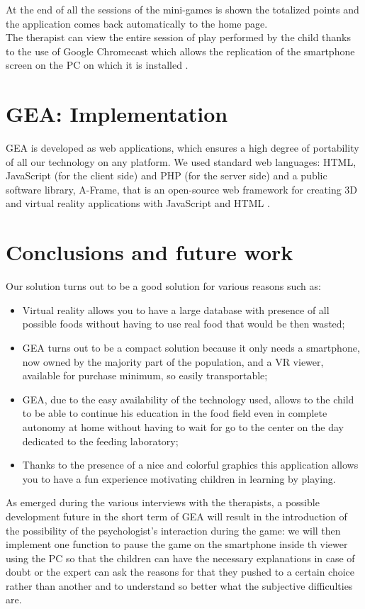 \documentclass{sigchi-ext}
\begin{document}
\medskip
At the end of all the sessions of the mini-games is shown the totalized points and the application comes back automatically to the home page.\\
\medskip
The therapist can view the entire session of play performed by the child thanks to the use of Google Chromecast which allows the replication of the smartphone screen on the PC on which it is installed \cite{rif9}.


\section{GEA: Implementation}
GEA is developed as web applications, which ensures a high degree of portability of all our technology on any platform. We used standard web languages: HTML, JavaScript (for the client side) and PHP (for the server side) and a public software library, A-Frame, that is an open-source web framework for creating 3D and virtual reality applications with JavaScript and HTML \cite{rif10}.

\section{Conclusions and future work}
Our solution turns out to be a good solution for various reasons such as:
\begin{itemize}
\item Virtual reality allows you to have a large database with presence of all possible foods without having to use real food that would be then wasted;
\item GEA turns out to be a compact solution because it only needs a smartphone, now owned by the majority
part of the population, and a VR viewer, available for purchase minimum, so easily transportable;
\item GEA, due to the easy availability of the technology used, allows to the child to be able to continue his education in the food field even in complete autonomy at home without having to wait for go to the center on the day dedicated to the feeding laboratory;
\item Thanks to the presence of a nice and colorful graphics this application allows you to have a fun experience motivating children in learning by playing.
\end{itemize}

As emerged during the various interviews with the therapists, a possible development future in the short term of GEA will result in the introduction of the possibility of the psychologist's interaction during the game: we will then implement one function to pause the game on the smartphone inside th viewer using the PC so that the children can have the necessary explanations in case of doubt or the expert can ask the reasons for that they pushed to a certain choice rather than another and to understand so better what the subjective difficulties are.\\
\end{document}
